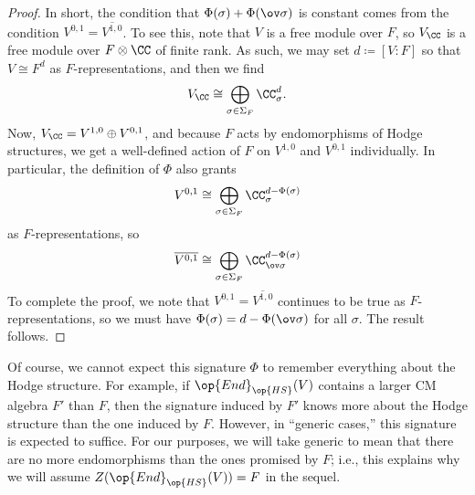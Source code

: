 \documentclass[../thesis.tex]{subfiles}
\begin{document}
\begin{proof}
	In short, the condition that $\Phi(\sigma)+\Phi(\ov\sigma)$ is constant comes from the condition $V^{0,1}=\overline{V^{1,0}}$. To see this, note that $V$ is a free module over $F$, so $V_\CC$ is a free module over $F\otimes\CC$ of finite rank. As such, we may set $d\coloneqq[V:F]$ so that $V\cong F^d$ as $F$-representations, and then we find
	\[V_\CC\cong\bigoplus_{\sigma\in\Sigma_F}\CC_\sigma^d.\]
	Now, $V_\CC=V^{1,0}\oplus V^{0,1}$, and because $F$ acts by endomorphisms of Hodge structures, we get a well-defined action of $F$ on $V^{1,0}$ and $V^{0,1}$ individually. In particular, the definition of $\Phi$ also grants
	\[V^{0,1}\cong\bigoplus_{\sigma\in\Sigma_F}\CC_\sigma^{d-\Phi(\sigma)}\]
	as $F$-representations, so
	\[\overline{V^{0,1}}\cong\bigoplus_{\sigma\in\Sigma_F}\CC_{\ov\sigma}^{d-\Phi(\sigma)}\]
	To complete the proof, we note that $V^{0,1}=\overline{V^{1,0}}$ continues to be true as $F$-representations, so we must have $\Phi(\sigma)=d-\Phi(\ov\sigma)$ for all $\sigma$. The result follows.
\end{proof}
Of course, we cannot expect this signature $\Phi$ to remember everything about the Hodge structure. For example, if $\op{End}_{\op{HS}}(V)$ contains a larger CM algebra $F'$ than $F$, then the signature induced by $F'$ knows more about the Hodge structure than the one induced by $F$. However, in ``generic cases,'' this signature is expected to suffice. For our purposes, we will take generic to mean that there are no more endomorphisms than the ones promised by $F$; i.e., this explains why we will assume $Z(\op{End}_{\op{HS}}(V))=F$ in the sequel.
\end{document}
